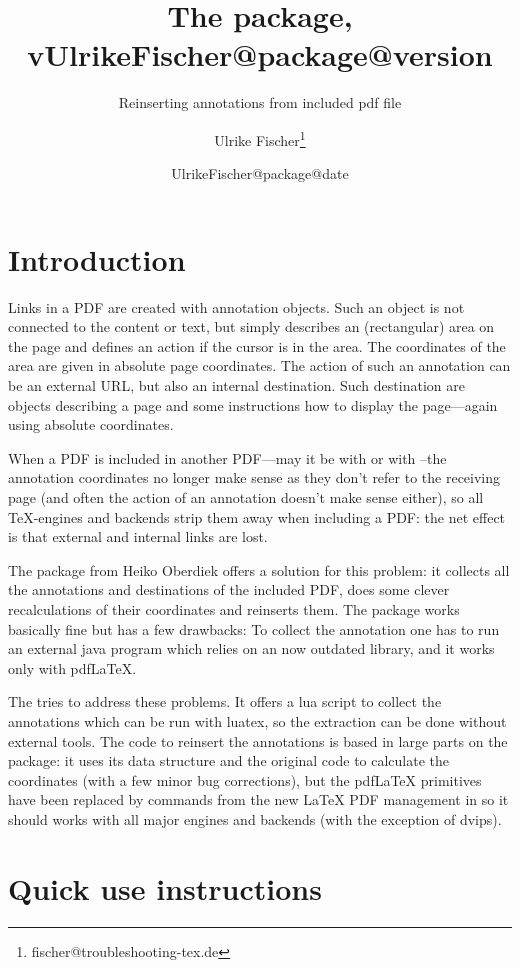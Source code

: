 \documentclass[DIV=12,parskip=half-,bibliography=totoc]{scrartcl}
\title{The \pkg{newpax} package, v\csname UlrikeFischer@package@version\endcsname}
\subtitle{Reinserting annotations from included pdf file}
\date{\csname UlrikeFischer@package@date\endcsname}
\author{Ulrike Fischer\thanks{fischer@troubleshooting-tex.de}}
\begin{document}
\maketitle

\section{Introduction}

Links in a PDF are created with annotation objects. Such an object is not connected to the content
or text, but simply describes an (rectangular) area on the page and defines an action if the
cursor is in the area. The coordinates of the area are given in absolute page coordinates.
The action of such an annotation can be an external URL, but also an internal destination. 
Such destination are objects describing a page and some instructions how to display the page---again using absolute coordinates.

When a PDF is included in another PDF---may it be with  or with --the annotation coordinates no longer make sense as they don't refer to the receiving page (and often the action of an annotation doesn't make sense either), so all TeX-engines and backends strip them away when including a PDF: the net effect is that external and internal links are lost.

The  package from Heiko Oberdiek offers a solution for this problem: it collects all the annotations
and destinations of the included PDF, does some clever recalculations of their coordinates and reinserts them.
The package works basically fine but has a few drawbacks: To collect the annotation one has to run an external
java program which relies on an now outdated library, and it works only with pdf\LaTeX{}.

The  tries to address these problems. It offers a lua script to collect the annotations which can be run with luatex,
so the extraction can be done without external tools. The code to reinsert the annotations is based in large parts on the  package: it uses its data structure and the original code to calculate the coordinates (with a few minor bug corrections), but the pdf\LaTeX{} primitives have been replaced by commands from the new \LaTeX{} PDF management in  so
it should works with all major engines and backends (with the exception of dvips).


\section{Quick use instructions}
\end{document}

